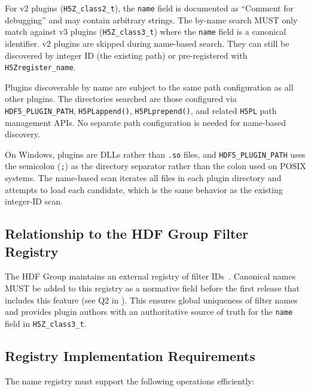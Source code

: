 \documentclass[../HDF5_RFC.tex]{subfiles}
\begin{document}
For v2 plugins
(\texttt{H5Z\_class2\_t}), the \texttt{name} field is documented as ``Comment for debugging''
and may contain arbitrary strings. The by-name search MUST only match against
v3 plugins (\texttt{H5Z\_class3\_t}) where the \texttt{name} field is a canonical identifier.
v2 plugins are skipped during name-based search. They can still be discovered
by integer ID (the existing path) or pre-registered with \texttt{H5Zregister\_name}.

Plugins discoverable by name are subject to the
same path configuration as all other plugins. The directories searched are
those configured via \texttt{HDF5\_PLUGIN\_PATH}, \texttt{H5PLappend()},
\texttt{H5PLprepend()}, and related \texttt{H5PL} path management APIs. No separate path
configuration is needed for name-based discovery.

On Windows, plugins are DLLs rather than \texttt{.so} files, and
\texttt{HDF5\_PLUGIN\_PATH} uses the semicolon (\texttt{;}) as the directory separator
rather than the colon used on POSIX systems. The name-based scan iterates all
files in each plugin directory and attempts to load each candidate, which is
the same behavior as the existing integer-ID scan.


\subsection{Relationship to the HDF Group Filter Registry}

The HDF Group maintains an external registry of filter
IDs~\cite{hdf5registeredfilters}. Canonical names MUST be added to this
registry as a normative field before the first release that includes this
feature (see Q2 in ). This ensures global
uniqueness of filter names and provides plugin authors with an authoritative
source of truth for the \texttt{name} field in \texttt{H5Z\_class3\_t}.


\subsection{Registry Implementation Requirements}
\label{sec:registry-impl}

The name registry must support the following operations efficiently:
\end{document}
